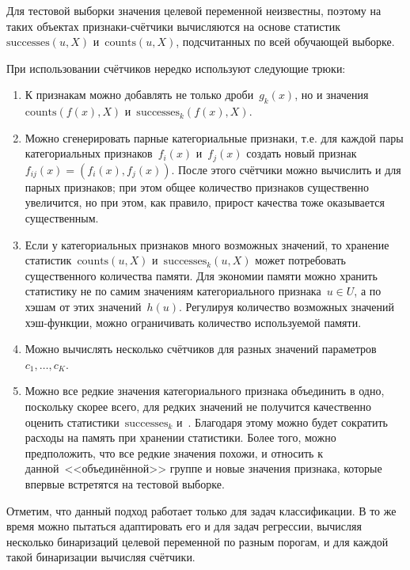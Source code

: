 \documentclass[12pt,fleqn]{article}
\begin{document}
Для тестовой выборки значения целевой переменной неизвестны, поэтому на таких
объектах признаки-счётчики вычисляются на основе статистик~$\text{successes}(u, X)$ и~$\text{counts}(u, X)$,
подсчитанных по всей обучающей выборке.

При использовании счётчиков нередко используют следующие трюки:
\begin{enumerate}
    \item К признакам можно добавлять не только дроби~$g_k(x)$,
        но и значения~$\text{counts}(f(x), X)$ и~$\text{successes}_k(f(x), X)$.
    \item Можно сгенерировать парные категориальные признаки, т.е. для каждой
        пары категориальных признаков~$f_i(x)$ и~$f_j(x)$ создать новый признак~$f_{ij}(x) = (f_i(x), f_j(x))$.
        После этого счётчики можно вычислить и для парных признаков;
        при этом общее количество признаков существенно увеличится, но при этом, как правило,
        прирост качества тоже оказывается существенным.
    \item Если у категориальных признаков много возможных значений, то хранение статистик~$\text{counts}(u, X)$
        и~$\text{successes}_k(u, X)$ может потребовать существенного количества памяти.
        Для экономии памяти можно хранить статистику не по самим значениям категориального признака~$u \in U$,
        а по хэшам от этих значений~$h(u)$.
        Регулируя количество возможных значений хэш-функции, можно ограничивать количество используемой памяти.
    \item Можно вычислять несколько счётчиков для разных значений параметров~$c_1, \dots, c_K$.
    \item Можно все редкие значения категориального признака объединить в одно, поскольку скорее всего,
        для редких значений не получится качественно оценить статистики~$\text{successes}_k$ и~.
        Благодаря этому можно будет сократить расходы на память при хранении статистики.
        Более того, можно предположить, что все редкие значения похожи,
        и относить к данной~<<объединённой>> группе и новые значения признака,
        которые впервые встретятся на тестовой выборке.
\end{enumerate}

Отметим, что данный подход работает только для задач классификации.
В то же время можно пытаться адаптировать его и для задач регрессии, вычисляя
несколько бинаризаций целевой переменной по разным порогам,
и для каждой такой бинаризации вычисляя счётчики.
\end{document}
